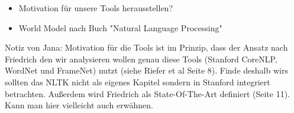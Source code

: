 \begin{itemize} 
\item Motivation für unsere Tools herausstellen? 
\item World Model nach Buch "Natural Language Processing"
\end{itemize}

Notiz von Jana: 
Motivation für die Tools ist im Prinzip, dass der Ansatz nach Friedrich den wir analysieren wollen genau diese Tools (Stanford CoreNLP, WordNet und FrameNet) nutzt (siehe Riefer et al Seite 8). Finde deshalb wirs sollten das NLTK nicht als eigenes Kapitel sondern in Stanford integriert betrachten. Außerdem wird Friedrich als State-Of-The-Art definiert (Seite 11). Kann man hier vielleicht auch erwähnen. 
